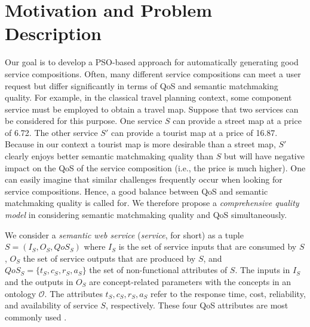 \documentclass{llncs}
\begin{document}
\section{Motivation and Problem Description}\label{Motivation and Problem Description}\label{Motivation}\label{problemDes}\label{qualityModel}\label{Comprehensive_Quality_Model}\label{qualityModel}

Our goal is to develop a PSO-based approach for automatically generating good service compositions. Often, many different service compositions can meet a user request but differ significantly in terms of QoS and semantic matchmaking quality. For example, in the classical travel planning context, some component service must be employed to obtain a travel map. Suppose that two services can be considered for this purpose. One service $S$ can provide a street map at a price of 6.72. The other service $S'$ can provide a tourist map at a price of 16.87. Because in our context a tourist map is more desirable than a street map, $S'$ clearly enjoys better semantic matchmaking quality than $S$ but will have negative impact on the QoS of the service composition (i.e., the price is much higher). One can easily imagine that similar challenges frequently occur when looking for service compositions. Hence, a good balance between QoS and semantic matchmaking quality is called for. We therefore propose a \emph{comprehensive quality model} in considering semantic matchmaking quality and QoS simultaneously.

We consider a \emph{semantic web service} (\emph{service}, for short) as a tuple $S = (I_{S}, O_{S}, QoS_S)$ where $I_{S}$ is the set of service inputs that are consumed by $S$, $O_{S}$ the set of service outputs that are produced by $S$, and $QoS_{S}=\{t_S, c_S, r_S, a_S\}$ the set of non-functional attributes of $S$. The inputs in $I_{S}$ and the outputs in $O_{S}$ are concept-related parameters with the concepts in an ontology $\mathcal{O}$. The attributes $t_S, c_S, r_S, a_S$ refer to the response time, cost, reliability, and availability of service $S$, respectively. These four QoS attributes are most commonly used \cite{zeng2003quality}.
\end{document}
